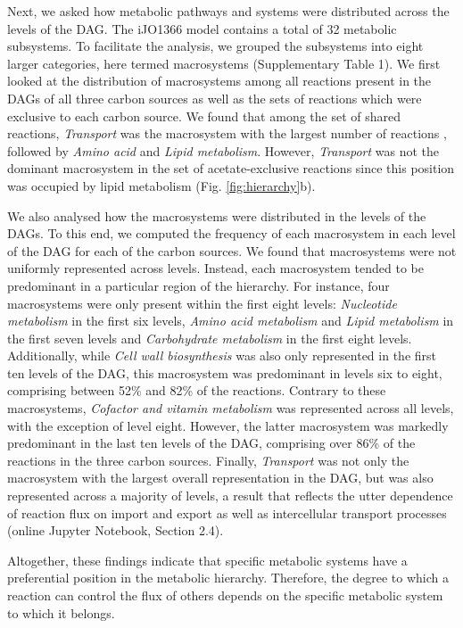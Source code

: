 \documentclass[12pt]{article}
\begin{document}
Next, we asked how metabolic pathways and systems were distributed across the levels of the DAG. The iJO1366 model contains a total of 32 metabolic subsystems. To facilitate the analysis, we grouped the subsystems into eight larger categories, here termed macrosystems (Supplementary Table 1). We first looked at the distribution of macrosystems among all reactions present in the DAGs of all three carbon sources as well as the sets of reactions which were exclusive to each carbon source. We found that among the set of shared reactions, \emph{Transport} was the macrosystem with the largest number of reactions , followed by \emph{Amino acid} and \emph{Lipid metabolism}. However, \emph{Transport} was not the dominant macrosystem in the set of acetate-exclusive reactions since this position was occupied by lipid metabolism (Fig. \ref{fig:hierarchy}b).

We also analysed how the macrosystems were distributed in the levels of the DAGs. To this end, we computed the frequency of each macrosystem in each level of the DAG for each of the carbon sources. We found that macrosystems were not uniformly represented across levels. Instead, each macrosystem tended to be predominant in a particular region of the hierarchy. For instance, four macrosystems were only present within the first eight levels:  \emph{Nucleotide metabolism} in the first six levels, \emph{Amino acid metabolism} and  \emph{Lipid metabolism} in the first seven levels and \emph{Carbohydrate metabolism} in the first eight levels. Additionally, while \emph{Cell wall biosynthesis} was also only represented in the first ten levels of the DAG, this macrosystem was predominant in levels six to eight, comprising between 52\% and 82\% of the reactions. Contrary to these macrosystems, \emph{Cofactor and vitamin metabolism} was represented across all levels, with the exception of level eight. However, the latter macrosystem was markedly predominant in the last ten levels of the DAG, comprising over 86\% of the reactions in the three carbon sources. Finally, \emph{Transport} was not only the macrosystem with the largest overall representation in the DAG, but was also represented across a majority of levels, a result that reflects the utter dependence of reaction flux on import and export as well as intercellular transport processes (online Jupyter Notebook, Section 2.4).

Altogether, these findings indicate that specific metabolic systems have a preferential position in the metabolic hierarchy. Therefore, the degree to which a reaction can control the flux of others depends on the specific metabolic system to which it belongs.
\end{document}
